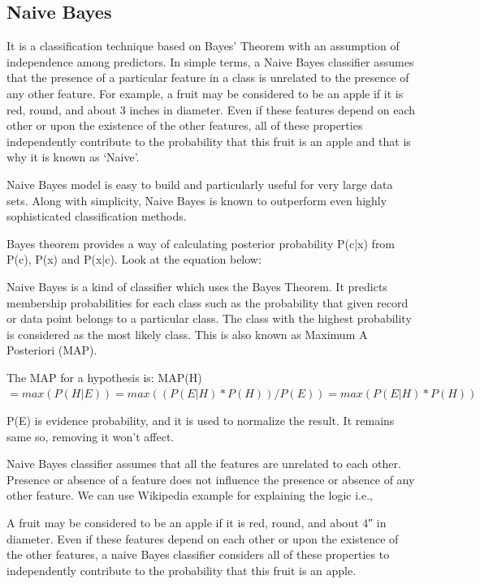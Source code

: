 \documentclass[12pt]{article}
\numberwithin{equation}{section}
\numberwithin{table}{section}
\numberwithin{figure}{section}
\begin{document}
\subsection{Naive Bayes} \label{naive}

It is a classification technique based on Bayes’ Theorem with an assumption of independence among predictors. In simple terms, a Naive Bayes classifier assumes that the presence of a particular feature in a class is unrelated to the presence of any other feature. For example, a fruit may be considered to be an apple if it is red, round, and about 3 inches in diameter. Even if these features depend on each other or upon the existence of the other features, all of these properties independently contribute to the probability that this fruit is an apple and that is why it is known as ‘Naive’.

Naive Bayes model is easy to build and particularly useful for very large data sets. Along with simplicity, Naive Bayes is known to outperform even highly sophisticated classification methods.

Bayes theorem provides a way of calculating posterior probability P(c|x) from P(c), P(x) and P(x|c). Look at the equation below:



Naive Bayes is a kind of classifier which uses the Bayes Theorem. It predicts membership probabilities for each class such as the probability that given record or data point belongs to a particular class.  The class with the highest probability is considered as the most likely class. This is also known as Maximum A Posteriori (MAP).

The MAP for a hypothesis is:
MAP(H)
$= max( P(H|E) )
=  max( (P(E|H)*P(H))/P(E))
= max(P(E|H)*P(H))
$

P(E) is evidence probability, and it is used to normalize the result. It remains same so, removing it won’t affect.

Naive Bayes classifier assumes that all the features are unrelated to each other. Presence or absence of a feature does not influence the presence or absence of any other feature. We can use Wikipedia example for explaining the logic i.e.,

A fruit may be considered to be an apple if it is red, round, and about 4″ in diameter.  Even if these features depend on each other or upon the existence of the other features, a naive Bayes classifier considers all of these properties to independently contribute to the probability that this fruit is an apple.
\end{document}
